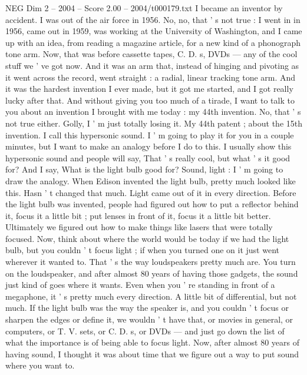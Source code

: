 \begin{textsample}{NEG Dim 2 – 2004 – Score 2.00 – 2004/t000179.txt}  \label{ex:f2_neg_073}
I became an inventor by accident.
I was out of the air force in 1956.
No, no, that ' s not true : I went in in 1956, came out in 1959, was working at the University of Washington, and I came up with an idea, from reading a magazine article, for a new kind of a phonograph tone arm.
Now, that was before cassette tapes, C.
D. s, DVDs — any of the cool stuff we ' ve got now.
And it was an arm that, instead of hinging and pivoting as it went across the record, went straight : a radial, linear tracking tone arm.
And it was the hardest invention I ever made, but it got me started, and I got really lucky after that.
And without giving you too much of a tirade, I want to talk to you about an invention I brought with me today : my 44th invention.
No, that ' s not true either.
Golly, I ' m just totally losing it.
My 44th patent ; about the 15th invention.
I call this hypersonic sound.
I ' m going to play it for you in a couple minutes, but I want to make an analogy before I do to this.
I usually show this hypersonic sound and people will say, That ' s really cool, but what ' s it good for?
And I say, What is the light bulb good for?
Sound, light : I ' m going to draw the analogy.
When Edison invented the light bulb, pretty much looked like this.
Hasn ' t changed that much.
Light came out of it in every direction.
Before the light bulb was invented, people had figured out how to put a reflector behind it, focus it a little bit ; put lenses in front of it, focus it a little bit better.
Ultimately we figured out how to make things like lasers that were totally focused.
Now, think about where the world would be today if we had the light bulb, but you couldn ' t focus light ; if when you turned one on it just went wherever it wanted to.
That ' s the way loudspeakers pretty much are.
You turn on the loudspeaker, and after almost 80 years of having those gadgets, the sound just kind of goes where it wants.
Even when you ' re standing in front of a megaphone, it ' s pretty much every direction.
A little bit of differential, but not much.
If the light bulb was the way the speaker is, and you couldn ' t focus or sharpen the edges or define it, we wouldn ' t have that, or movies in general, or computers, or T.
V. sets, or C.
D. s, or DVDs — and just go down the list of what the importance is of being able to focus light.
Now, after almost 80 years of having sound, I thought it was about time that we figure out a way to put sound where you want to.

\end{textsample}
